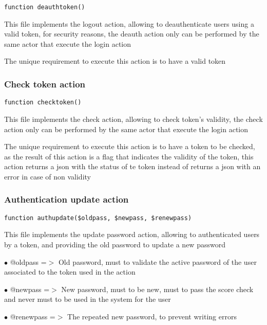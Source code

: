 \documentclass[a4paper]{article}
\begin{document}
\begin{lstlisting}
function deauthtoken()
\end{lstlisting}

This file implements the logout action, allowing to deauthenticate users
using a valid token, for security reasons, the deauth action only can
be performed by the same actor that execute the login action

The unique requirement to execute this action is to have a valid token

\hypertarget{toc378}{}
\subsubsection{Check token action}

\begin{lstlisting}
function checktoken()
\end{lstlisting}

This file implements the check action, allowing to check token's validity, the check
action only can be performed by the same actor that execute the login action

The unique requirement to execute this action is to have a token to be checked, as the
result of this action is a flag that indicates the validity of the token, this action
returns a json with the status of te token instead of returns a json with an error in
case of non validity

\hypertarget{toc379}{}
\subsubsection{Authentication update action}

\begin{lstlisting}
function authupdate($oldpass, $newpass, $renewpass)
\end{lstlisting}

This file implements the update password action, allowing to authenticated
users by a token, and providing the old password to update a new password

\begin{compactitem}
\item[\color{myblue}$\bullet$] @oldpass   =$>$ Old password, must to validate the active password of the user
              associated to the token used in the action
\item[\color{myblue}$\bullet$] @newpass   =$>$ New password, must to be new, must to pass the score check and
              never must to be used in the system for the user
\item[\color{myblue}$\bullet$] @renewpass =$>$ The repeated new password, to prevent writing errors
\end{compactitem}
\end{document}
